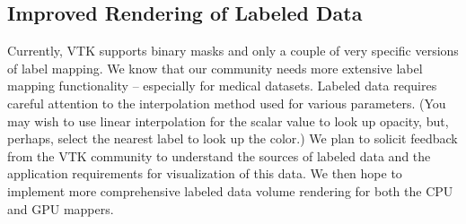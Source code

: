 \subsection{Improved Rendering of Labeled Data}
\label{improved-rendering-of-labeled-data}
Currently, VTK supports binary masks and only a couple of very specific versions
of label mapping. We know that our community needs more extensive label mapping
functionality – especially for medical datasets. Labeled data requires careful
attention to the interpolation method used for various parameters. (You may wish
to use linear interpolation for the scalar value to look up opacity, but,
perhaps, select the nearest label to look up the color.) We
plan to solicit feedback from the VTK community to understand the sources of
labeled data and the application requirements for visualization of this data. We
then hope to implement more comprehensive labeled data volume rendering for both
the CPU and GPU mappers.
